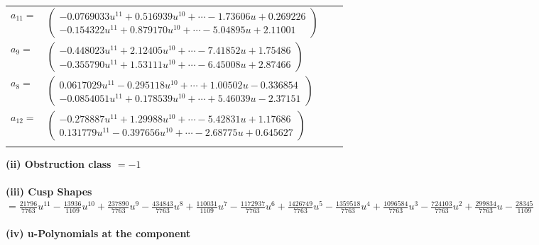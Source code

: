 \documentclass[1p]{elsarticle_modified}
\theoremstyle{definition}
\begin{document}
\begin{tabular}{m{7pt} m{180pt} m{7pt} m{180pt} }
\flushright $a_{11}=$&$\begin{pmatrix}-0.0769033 u^{11}+0.516939 u^{10}+\cdots-1.73606 u+0.269226\\-0.154322 u^{11}+0.879170 u^{10}+\cdots-5.04895 u+2.11001\end{pmatrix}$ \\
\flushright $a_{9}=$&$\begin{pmatrix}-0.448023 u^{11}+2.12405 u^{10}+\cdots-7.41852 u+1.75486\\-0.355790 u^{11}+1.53111 u^{10}+\cdots-6.45008 u+2.87466\end{pmatrix}$ \\
\flushright $a_{8}=$&$\begin{pmatrix}0.0617029 u^{11}-0.295118 u^{10}+\cdots+1.00502 u-0.336854\\-0.0854051 u^{11}+0.178539 u^{10}+\cdots+5.46039 u-2.37151\end{pmatrix}$ \\
\flushright $a_{12}=$&$\begin{pmatrix}-0.278887 u^{11}+1.29988 u^{10}+\cdots-5.42831 u+1.17686\\0.131779 u^{11}-0.397656 u^{10}+\cdots-2.68775 u+0.645627\end{pmatrix}$\\&\end{tabular}
\flushleft \textbf{(ii) Obstruction class $= -1$}\\~\\
\flushleft \textbf{(iii) Cusp Shapes $= \frac{21796}{7763} u^{11}-\frac{13936}{1109} u^{10}+\frac{237890}{7763} u^9-\frac{434843}{7763} u^8+\frac{110031}{1109} u^7-\frac{1172937}{7763} u^6+\frac{1426749}{7763} u^5-\frac{1359518}{7763} u^4+\frac{1096584}{7763} u^3-\frac{724103}{7763} u^2+\frac{299834}{7763} u-\frac{28345}{1109}$}\\~\\
\newpage\renewcommand{\arraystretch}{1}
\flushleft \textbf{(iv) u-Polynomials at the component}\newline \\
\end{document}
